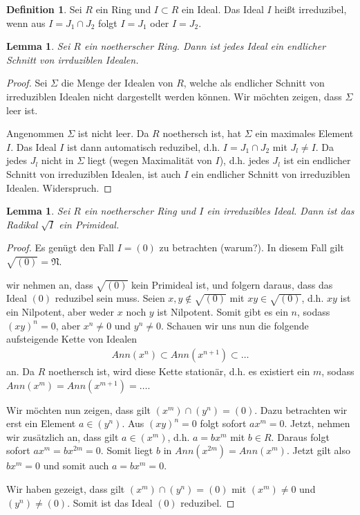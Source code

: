 \documentclass[reqno,12pt]{article}
\numberwithin{equation}{section}
\theoremstyle{plain}
\newtheorem{lemma}[thm]{Lemma}
\theoremstyle{definition}
\newtheorem{definition}[thm]{Definition}
\begin{document}
\begin{definition}
Sei $R$ ein Ring und $I \subset R$ ein Ideal. Das Ideal $I$ heißt {\sf irreduzibel}, wenn aus $I = J_1 \cap J_2$ folgt $I=J_1$ oder $I=J_2$.
\end{definition}

\begin{lemma}\label{lemma-noetherian-every-ideal-intersection-irred}
Sei $R$ ein noetherscher Ring. Dann ist jedes Ideal ein endlicher Schnitt von irrduziblen Idealen.
\end{lemma}

\begin{proof}
Sei $\Sigma$ die Menge der Idealen von $R$, welche als endlicher Schnitt von irreduziblen Idealen nicht dargestellt werden können. Wir möchten zeigen, dass $\Sigma$ leer ist.

Angenommen $\Sigma$ ist nicht leer. Da $R$ noethersch ist, hat $\Sigma$ ein maximales Element $I$. Das Ideal $I$ ist dann automatisch reduzibel, d.h. $I = J_1 \cap J_2$ mit $J_l \neq I$. Da jedes $J_l$ nicht in $\Sigma$  liegt (wegen Maximalität von $I$), d.h. jedes $J_l$ ist ein endlicher Schnitt von irreduziblen Idealen, ist auch $I$ ein endlicher Schnitt von irreduziblen Idealen. Widerspruch.
\end{proof}


\begin{lemma}
Sei $R$ ein noetherscher Ring und $I$ ein irreduzibles Ideal. Dann ist das Radikal $\sqrt{I}$ ein Primideal.
\end{lemma}

\begin{proof}
Es genügt den Fall $I = (0)$ zu betrachten (warum?). In diesem Fall gilt $\sqrt{(0)} = \mathfrak{N}$.

\smallskip

 wir nehmen an, dass $\sqrt{(0)}$ kein Primideal ist, und folgern daraus, dass das Ideal $(0)$ reduzibel sein muss. Seien $x,y \notin \sqrt{(0)}$ mit $xy \in \sqrt{(0)}$, d.h. $xy$ ist ein Nilpotent, aber weder $x$ noch $y$ ist Nilpotent. Somit gibt es ein $n$, sodass $(xy)^n = 0$, aber $x^n \neq 0$ und $y^n \neq 0$. Schauen wir uns nun die folgende aufsteigende Kette von Idealen
\begin{align*}
Ann(x^n) \subset Ann(x^{n+1}) \subset \dots
\end{align*}
an. Da $R$ noethersch ist, wird diese Kette stationär, d.h. es existiert ein $m$, sodass $Ann(x^m) = Ann(x^{m+1}) = \dots$.

Wir möchten nun zeigen, dass gilt $(x^m) \cap (y^n) = (0)$. Dazu betrachten wir erst ein Element $a \in (y^n)$. Aus $(xy)^n = 0$ folgt sofort $ax^m=0$. Jetzt, nehmen wir zusätzlich an, dass gilt $a \in (x^m)$, d.h. $a = bx^m$ mit $b \in R$. Daraus folgt sofort $ax^m = b x^{2m} = 0$. Somit liegt $b$ in $Ann(x^{2m})=Ann(x^m)$. Jetzt gilt also $bx^m=0$ und somit auch $a = bx^m = 0$.

Wir haben gezeigt, dass gilt $(x^m) \cap (y^n) = (0)$ mit $(x^m) \neq 0$ und $(y^n) \neq (0)$. Somit ist das Ideal $(0)$ reduzibel.
\end{proof}
\end{document}
